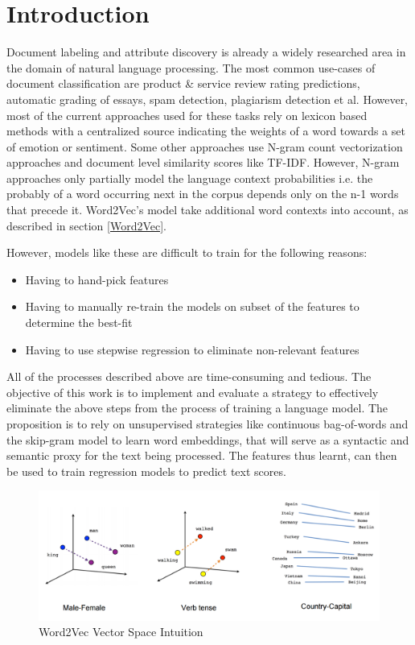 \documentclass[conference]{IEEEtran}
\begin{document}
\section{Introduction}
Document labeling and attribute discovery is already a widely researched area in the domain of natural language processing. The most common use-cases of document classification are product \& service review rating predictions, automatic grading of essays, spam detection, plagiarism detection et al. However, most of the current approaches used for these tasks rely on lexicon based methods with a centralized source indicating the weights of a word towards a set of emotion or sentiment. Some other approaches use N-gram count vectorization approaches and document level similarity scores like TF-IDF. However, N-gram approaches only partially model the language context probabilities i.e. the probably of a word occurring next in the corpus depends only on the n-1 words that precede it. Word2Vec's model take additional word contexts into account, as described in section \ref{Word2Vec}.

However, models like these are difficult to train for the following reasons:
\begin{itemize}
  \item Having to hand-pick features
  \item Having to manually re-train the models on subset of the features to determine the best-fit
  \item Having to use stepwise regression to eliminate non-relevant features
\end{itemize}

All of the processes described above are time-consuming and tedious. The objective of this work is to implement and evaluate a strategy to effectively eliminate the above steps from the process of training a language model. The proposition is to rely on unsupervised strategies like continuous bag-of-words and the skip-gram model to learn word embeddings, that will serve as a syntactic and semantic proxy for the text being processed. The features thus learnt, can then be used to train regression models to predict text scores.

\begin{figure}[ht]
\centering
\includegraphics[width=\textwidth]{images/word2vec_1.png}
\caption{Word2Vec Vector Space Intuition\cite{tensorflow_word2vec}}
\label{fig:word2vec-vectorspace-intuition}
\end{figure}
\end{document}
